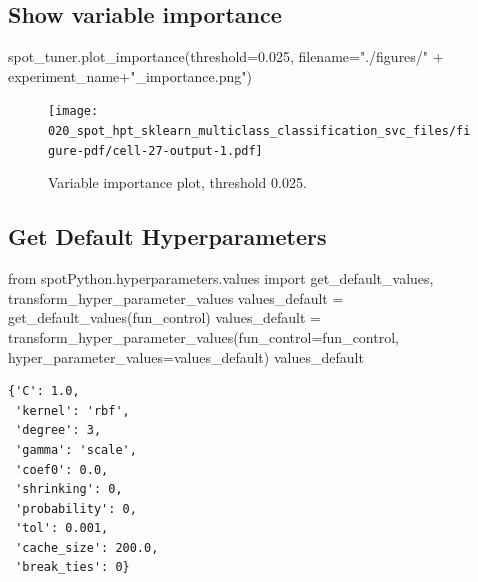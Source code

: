 \documentclass[
  letterpaper,
  DIV=11,
  numbers=noendperiod]{scrreprt}
\newenvironment{Shaded}{\begin{snugshade}}{\end{snugshade}}
\newcommand{\FloatTok}[1]{\textcolor[rgb]{0.68,0.00,0.00}{#1}}
\newcommand{\ImportTok}[1]{\textcolor[rgb]{0.00,0.46,0.62}{#1}}
\newcommand{\NormalTok}[1]{\textcolor[rgb]{0.00,0.23,0.31}{#1}}
\newcommand{\OperatorTok}[1]{\textcolor[rgb]{0.37,0.37,0.37}{#1}}
\newcommand{\StringTok}[1]{\textcolor[rgb]{0.13,0.47,0.30}{#1}}
\begin{document}
\hypertarget{show-variable-importance-3}{%
\subsection{Show variable importance}\label{show-variable-importance-3}}

\begin{Shaded}
\begin{Highlighting}[]
\NormalTok{spot\_tuner.plot\_importance(threshold}\OperatorTok{=}\FloatTok{0.025}\NormalTok{, filename}\OperatorTok{=}\StringTok{"./figures/"} \OperatorTok{+}\NormalTok{ experiment\_name}\OperatorTok{+}\StringTok{"\_importance.png"}\NormalTok{)}
\end{Highlighting}
\end{Shaded}

\begin{figure}[H]

{\centering \texttt{[image: 020\_spot\_hpt\_sklearn\_multiclass\_classification\_svc\_files/figure-pdf/cell-27-output-1.pdf]}

}

\caption{Variable importance plot, threshold 0.025.}

\end{figure}

\hypertarget{get-default-hyperparameters-3}{%
\subsection{Get Default
Hyperparameters}\label{get-default-hyperparameters-3}}

\begin{Shaded}
\begin{Highlighting}[]
\ImportTok{from}\NormalTok{ spotPython.hyperparameters.values }\ImportTok{import}\NormalTok{ get\_default\_values, transform\_hyper\_parameter\_values}
\NormalTok{values\_default }\OperatorTok{=}\NormalTok{ get\_default\_values(fun\_control)}
\NormalTok{values\_default }\OperatorTok{=}\NormalTok{ transform\_hyper\_parameter\_values(fun\_control}\OperatorTok{=}\NormalTok{fun\_control, hyper\_parameter\_values}\OperatorTok{=}\NormalTok{values\_default)}
\NormalTok{values\_default}
\end{Highlighting}
\end{Shaded}

\begin{verbatim}
{'C': 1.0,
 'kernel': 'rbf',
 'degree': 3,
 'gamma': 'scale',
 'coef0': 0.0,
 'shrinking': 0,
 'probability': 0,
 'tol': 0.001,
 'cache_size': 200.0,
 'break_ties': 0}
\end{verbatim}
\end{document}
